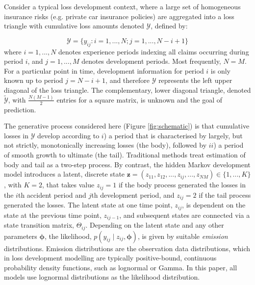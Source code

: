 Consider a typical loss development context, where
a large set of homogeneous insurance risks (e.g. private
car insurance policies) are aggregated
into a loss triangle with
cumulative loss amounts denoted
$\mathcal{Y}$, defined by:

\begin{equation}
	\mathcal{Y} = \{y_{ij} : i = 1, ..., N; j = 1, ..., N - i + 1\}
\end{equation}
%
where $i = 1, ..., N$ denotes experience periods 
indexing all claims occurring during period $i$, and $j = 1, ..., M$
denotes development periods. 
Most frequently, $N = M$.
For a particular point in time,
development information for period $i$ is only known up to period 
$j = N - i + 1$,
and therefore $\mathcal{Y}$ represents the left upper diagonal of
the loss triangle. The complementary, lower diagonal 
triangle, denoted $\tilde{\mathcal{Y}}$,
with $\frac{N (M - 1)}{2}$ entries 
for a square matrix,
is unknown and the goal of prediction.

The generative process considered here (Figure \ref{fig:schematic})
is that cumulative losses
in $\mathcal{Y}$ develop according to $i$) a period that is
characterised by largely, but not strictly, monotonically 
increasing losses 
(the body), followed by $ii$) a period of smooth
growth to ultimate (the tail). Traditional methods
treat estimation of body and tail as a two-step process.
By contrast, the hidden Markov development model introduces a
latent, discrete state $\bm{z} = (z_{11}, z_{12}, ..., z_{ij}, ..., z_{NM})
\in \{1, ...,  K\}$, with $K = 2$, that takes value
$z_{ij} = 1$ if the body process generated the losses in the $i$th
accident period and $j$th development period, and
$z_{ij} = 2$ if the tail process generated the losses.
The latent state at one time point, $z_{ij}$, is dependent
on the state at the previous time point, $z_{ij-1}$,
and subsequent states are connected via a state transition
matrix, $\Theta_{ij}$.
Depending on the latent state and any other parameters
$\bm{\phi}$, the likelihood, $p(y_{ij} \mid z_{ij}, \bm{\phi})$,
is given by suitable \textit{emission} distributions.
Emission distributions are the observation data distributions,
which in loss development modelling are typically
positive-bound, continuous probability density
functions, such as lognormal or Gamma.
In this paper, all models use lognormal distributions
as the likelihood distribution.

